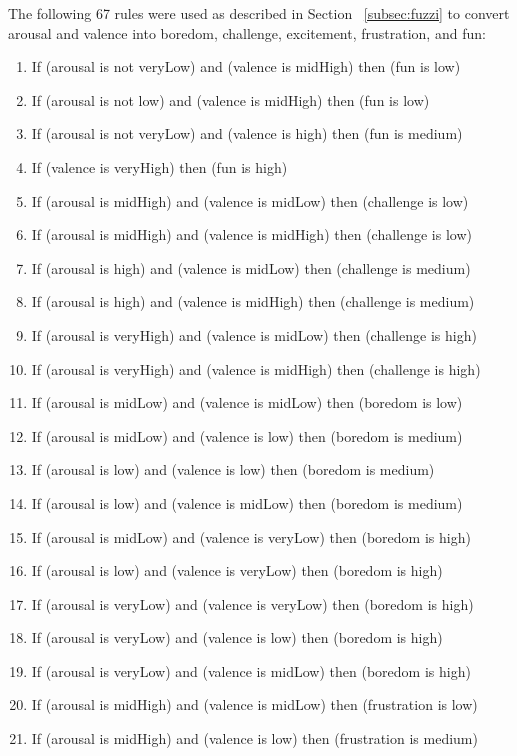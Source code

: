 
The following 67 rules were used as described in Section ~\ref{subsec:fuzzi} to convert arousal and valence into boredom, challenge, excitement, frustration, and fun:

\begin{enumerate}
\item If (arousal is not veryLow) and (valence is midHigh) then (fun is low)
\item If (arousal is not low) and (valence is midHigh) then (fun is low)
\item If (arousal is not veryLow) and (valence is high) then (fun is medium)
\item If (valence is veryHigh) then (fun is high)
\item If (arousal is midHigh) and (valence is midLow) then (challenge is low)
\item If (arousal is midHigh) and (valence is midHigh) then (challenge is low)
\item If (arousal is high) and (valence is midLow) then (challenge is medium)
\item If (arousal is high) and (valence is midHigh) then (challenge is medium)
\item If (arousal is veryHigh) and (valence is midLow) then (challenge is high)
\item If (arousal is veryHigh) and (valence is midHigh) then (challenge is high)
\item If (arousal is midLow) and (valence is midLow) then (boredom is low)
\item If (arousal is midLow) and (valence is low) then (boredom is medium)
\item If (arousal is low) and (valence is low) then (boredom is medium)
\item If (arousal is low) and (valence is midLow) then (boredom is medium)
\item If (arousal is midLow) and (valence is veryLow) then (boredom is high)
\item If (arousal is low) and (valence is veryLow) then (boredom is high)
\item If (arousal is veryLow) and (valence is veryLow) then (boredom is high)
\item If (arousal is veryLow) and (valence is low) then (boredom is high)
\item If (arousal is veryLow) and (valence is midLow) then (boredom is high)
\item If (arousal is midHigh) and (valence is midLow) then (frustration is low)
\item If (arousal is midHigh) and (valence is low) then (frustration is medium)

\end{enumerate}
